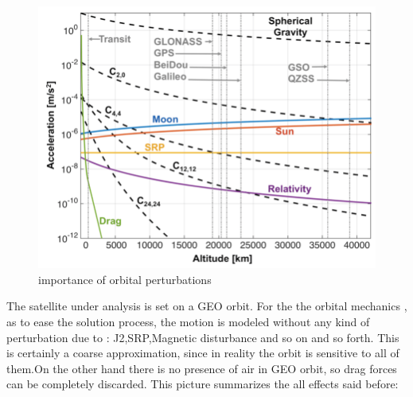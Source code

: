 \documentclass[11pt]{article}
\begin{document}
\begin{figure} [H]
\centering 
\includegraphics[scale=0.3]{Perturbations.png}
\caption{ importance of orbital perturbations
\cite{perturbations}}
\end{figure}
The satellite under analysis is set on a GEO orbit.  For the the orbital mechanics , as to ease the solution process, the motion is modeled without any kind of perturbation due to : J2,SRP,Magnetic disturbance  and so on and so forth. This is certainly a coarse approximation, since in reality the orbit is sensitive to all of them.On the other hand there is no presence of air in GEO orbit, so drag forces can be completely discarded. This picture summarizes the all effects said before:
\end{document}
